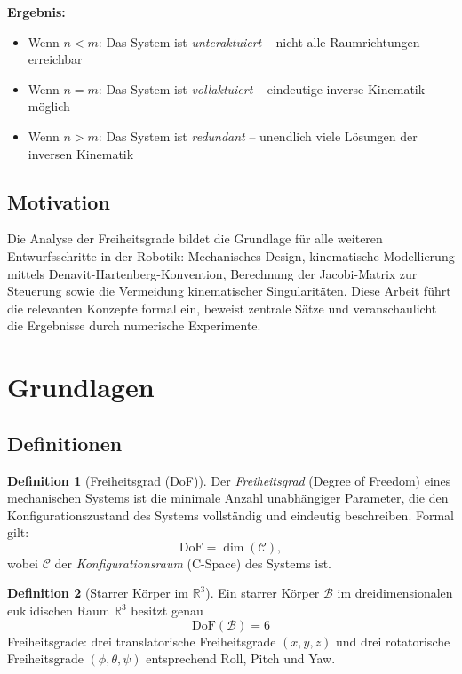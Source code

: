 ﻿\documentclass[a4paper,12pt]{article}
\theoremstyle{definition}
\newtheorem{definition}{Definition}
\begin{document}
\textbf{Ergebnis:}
\begin{itemize}
	\item Wenn $n < m$: Das System ist \emph{unteraktuiert} -- nicht alle Raumrichtungen erreichbar
	\item Wenn $n = m$: Das System ist \emph{vollaktuiert} -- eindeutige inverse Kinematik möglich
	\item Wenn $n > m$: Das System ist \emph{redundant} -- unendlich viele Lösungen der inversen Kinematik
\end{itemize}

\subsection{Motivation}

Die Analyse der Freiheitsgrade bildet die Grundlage für alle weiteren Entwurfsschritte in der Robotik: Mechanisches Design, kinematische Modellierung mittels Denavit-Hartenberg-Konvention, Berechnung der Jacobi-Matrix zur Steuerung sowie die Vermeidung kinematischer Singularitäten. Diese Arbeit führt die relevanten Konzepte formal ein, beweist zentrale Sätze und veranschaulicht die Ergebnisse durch numerische Experimente.

\section{Grundlagen}

\subsection{Definitionen}

\begin{definition}[Freiheitsgrad (DoF)]
	Der \emph{Freiheitsgrad} (Degree of Freedom) eines mechanischen Systems ist die minimale Anzahl unabhängiger Parameter, die den Konfigurationszustand des Systems vollständig und eindeutig beschreiben. Formal gilt:
	\[
		\text{DoF} = \dim(\mathcal{C}),
	\]
	wobei $\mathcal{C}$ der \emph{Konfigurationsraum} (C-Space) des Systems ist.
\end{definition}

\begin{definition}[Starrer Körper im $\mathbb{R}^3$]
	Ein starrer Körper $\mathcal{B}$ im dreidimensionalen euklidischen Raum $\mathbb{R}^3$ besitzt genau
	\[
		\text{DoF}(\mathcal{B}) = 6
	\]
	Freiheitsgrade: drei translatorische Freiheitsgrade $(x, y, z)$ und drei rotatorische Freiheitsgrade $(\phi, \theta, \psi)$ entsprechend Roll, Pitch und Yaw.
\end{definition}
\end{document}
